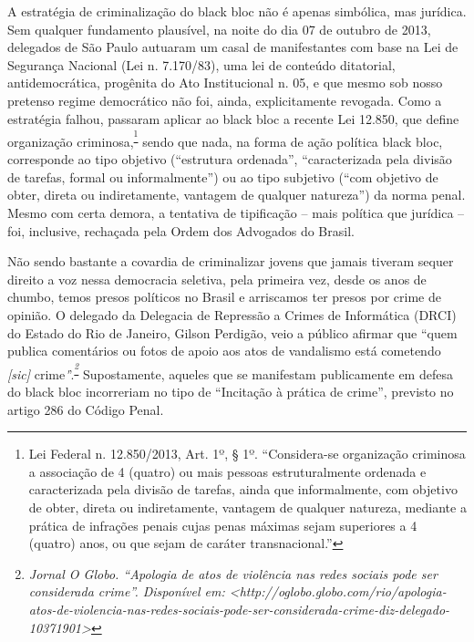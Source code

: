A estratégia de criminalização do black bloc não é apenas simbólica, mas
jurídica. Sem qualquer fundamento plausível, na noite do dia 07 de
outubro de 2013, delegados de São Paulo autuaram um casal de
manifestantes com base na Lei de Segurança Nacional (Lei n. 7.170/83),
uma lei de conteúdo ditatorial, antidemocrática, progênita do Ato
Institucional n. 05, e que mesmo sob nosso pretenso regime democrático
não foi, ainda, explicitamente revogada. Como a estratégia falhou,
passaram aplicar ao black bloc a recente Lei 12.850, que define
organização criminosa,\textsuperscript{\footnote{Lei Federal n.
  12.850/2013, Art. 1º, § 1º. ``Considera-se organização criminosa a
  associação de 4 (quatro) ou mais pessoas estruturalmente ordenada e
  caracterizada pela divisão de tarefas, ainda que informalmente, com
  objetivo de obter, direta ou indiretamente, vantagem de qualquer
  natureza, mediante a prática de infrações penais cujas penas máximas
  sejam superiores a 4 (quatro) anos, ou que sejam de caráter
  transnacional.''}} sendo que nada, na forma de ação política black
bloc, corresponde ao tipo objetivo (``estrutura ordenada'',
``caracterizada pela divisão de tarefas, formal ou informalmente'') ou
ao tipo subjetivo (``com objetivo de obter, direta ou indiretamente,
vantagem de qualquer natureza'') da norma penal. Mesmo com certa demora,
a tentativa de tipificação -- mais política que jurídica -- foi,
inclusive, rechaçada pela Ordem dos Advogados do Brasil.

Não sendo bastante a covardia de criminalizar jovens que jamais tiveram
sequer direito a voz nessa democracia seletiva, pela primeira vez, desde
os anos de chumbo, temos presos políticos no Brasil e arriscamos ter
presos por crime de opinião. O delegado da Delegacia de Repressão a
Crimes de Informática (DRCI) do Estado do Rio de Janeiro, Gilson
Perdigão, veio a público afirmar que ``quem publica comentários ou fotos
de apoio aos atos de vandalismo está cometendo \emph{[sic]}
crime\emph''.\textsuperscript{\emph{\footnote{\emph{Jornal O Globo.
  ``Apologia de atos de violência nas redes sociais pode ser considerada
  crime''. Disponível em:
  \textless{}}{\emph{http://oglobo.globo.com/rio/apologia-atos-de-violencia-nas-redes-sociais-pode-ser-considerada-crime-diz-delegado-10371901}}\emph{\textgreater{}}}}}\emph{
}Supostamente, aqueles que se manifestam publicamente em defesa do black
bloc incorreriam no tipo de ``Incitação à prática de crime'', previsto
no artigo 286 do Código Penal.

